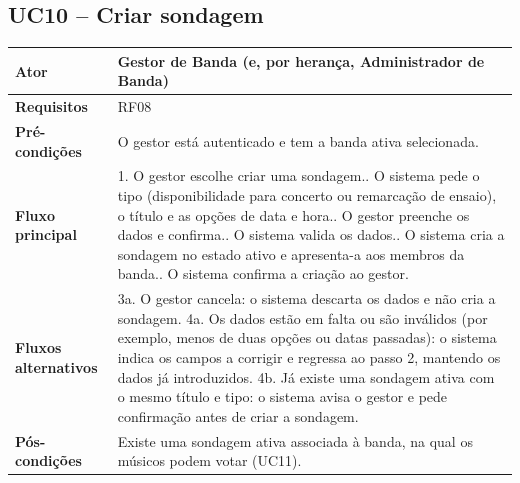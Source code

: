 \subsection{UC10 -- Criar sondagem}
\begin{tabular}{|p{3.2cm}|p{11cm}|}
\hline
\textbf{Ator} & Gestor de Banda (e, por herança, Administrador de Banda) \\ \hline
\textbf{Requisitos} & RF08 \\ \hline
\textbf{Pré-condições} & O gestor está autenticado e tem a banda ativa selecionada. \\ \hline
\textbf{Fluxo principal} &
1. O gestor escolhe criar uma sondagem.\newline
2. O sistema pede o tipo (disponibilidade para concerto ou remarcação de ensaio), o título e as opções de data e hora.\newline
3. O gestor preenche os dados e confirma.\newline
4. O sistema valida os dados.\newline
5. O sistema cria a sondagem no estado ativo e apresenta-a aos membros da banda.\newline
6. O sistema confirma a criação ao gestor. \\ \hline
\textbf{Fluxos alternativos} &
3a. O gestor cancela: o sistema descarta os dados e não cria a sondagem.\newline
4a. Os dados estão em falta ou são inválidos (por exemplo, menos de duas opções ou datas passadas): o sistema indica os campos a corrigir e regressa ao passo 2, mantendo os dados já introduzidos.\newline
4b. Já existe uma sondagem ativa com o mesmo título e tipo: o sistema avisa o gestor e pede confirmação antes de criar a sondagem. \\ \hline
\textbf{Pós-condições} & Existe uma sondagem ativa associada à banda, na qual os músicos podem votar (UC11). \\ \hline
\end{tabular}

